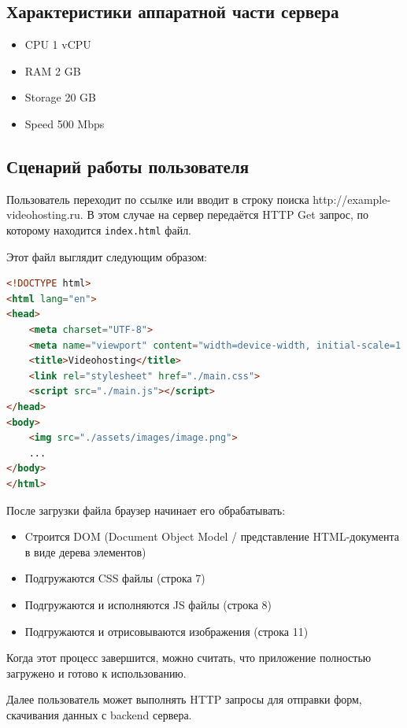 \documentclass[12pt]{article}
\begin{document}
\subsection{Характеристики аппаратной части сервера}

\begin{itemize}
    \item CPU 1 vCPU
    \item RAM 2 GB
    \item Storage 20 GB
    \item Speed 500 Mbps
\end{itemize}

\subsection{Сценарий работы пользователя}

Пользователь переходит по ссылке или вводит в строку поиска http://example-videohosting.ru.
В этом случае на сервер передаётся HTTP Get запрос, по которому находится \verb|index.html| файл.

Этот файл выглядит следующим образом:

\begin{lstlisting}[language=HTML]
<!DOCTYPE html>
<html lang="en">
<head>
    <meta charset="UTF-8">
    <meta name="viewport" content="width=device-width, initial-scale=1.0">
    <title>Videohosting</title>
    <link rel="stylesheet" href="./main.css">
    <script src="./main.js"></script>
</head>
<body>
    <img src="./assets/images/image.png">
    ...
</body>
</html>
\end{lstlisting}

После загрузки файла браузер начинает его обрабатывать:

\begin{itemize}
    \item Cтроится DOM (Document Object Model / представление HTML-документа в виде дерева элементов)
    \item Подгружаются CSS файлы (строка 7)
    \item Подгружаются и исполняются JS файлы (строка 8)
    \item Подгружаются и отрисовываются изображения (строка 11)
\end{itemize}

Когда этот процесс завершится, можно считать, что приложение полностью загружено и готово к использованию.

Далее пользователь может выполнять HTTP запросы для отправки форм, скачивания данных с backend сервера.
\end{document}
